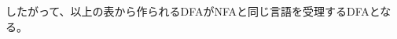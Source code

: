\documentclass[uplatex,dvipdfmx,a4paper,10pt]{jsarticle}
\begin{document}
      したがって、以上の表から作られるDFAがNFAと同じ言語を受理するDFAとなる。
    
    
    
    \appendix
    \setcounter{figure}{0}
    \setcounter{table}{0}
    \renewcommand{\thetable}{\Alph{section}\arabic{table}}
    \renewcommand{\thefigure}{\Alph{section}\arabic{figure}}
    \makeatletter 
    \newcommand{\section@cntformat}{付録 \thesection:\ }
    \makeatother
    
    
\end{document}
